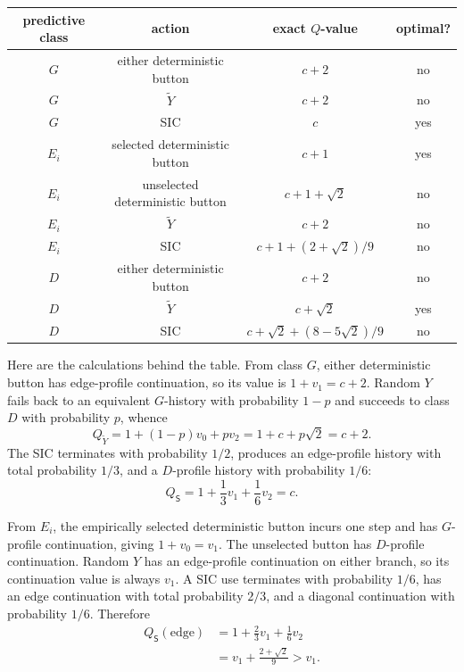 \documentclass[11pt]{article}
\theoremstyle{definition}
\theoremstyle{remark}
\begin{document}
\begin{center}
\small
\begin{tabular}{c c c c}
\toprule
predictive class & action & exact \(Q\)-value & optimal?\\
\midrule
\(G\) & either deterministic button & \(c+2\) & no\\
\(G\) & \(\widetilde Y\) & \(c+2\) & no\\
\(G\) & SIC & \(c\) & yes\\
\midrule
\(E_i\) & selected deterministic button & \(c+1\) & yes\\
\(E_i\) & unselected deterministic button & \(c+1+\sqrt2\) & no\\
\(E_i\) & \(\widetilde Y\) & \(c+2\) & no\\
\(E_i\) & SIC & \(c+1+(2+\sqrt2)/9\) & no\\
\midrule
\(D\) & either deterministic button & \(c+2\) & no\\
\(D\) & \(\widetilde Y\) & \(c+\sqrt2\) & yes\\
\(D\) & SIC & \(c+\sqrt2+(8-5\sqrt2)/9\) & no\\
\bottomrule
\end{tabular}
\end{center}

Here are the calculations behind the table. From class \(G\), either
deterministic button has edge-profile continuation, so its value is
\(1+v_1=c+2\). Random \(Y\) fails back to an equivalent \(G\)-history with
probability \(1-p\) and succeeds to class \(D\) with probability
\(p\), whence
\[
 Q_{\widetilde Y}=1+(1-p)v_0+pv_2
 =1+c+p\sqrt2=c+2.
\]
The SIC terminates with probability \(1/2\), produces an edge-profile history
with total probability \(1/3\), and a \(D\)-profile history with probability
\(1/6\):
\[
 Q_{\mathsf S}=1+\frac13v_1+\frac16v_2=c.
\]

From \(E_i\), the empirically selected deterministic button incurs one step
and has \(G\)-profile continuation, giving \(1+v_0=v_1\). The unselected
button has \(D\)-profile continuation. Random \(Y\) has an edge-profile
continuation on either branch, so its continuation value is always \(v_1\).
A SIC use terminates with probability \(1/6\), has
an edge continuation with total probability \(2/3\), and a diagonal
continuation with probability \(1/6\). Therefore
\begin{align*}
 Q_{\mathsf S}(\text{edge})
 &=1+\frac23v_1+\frac16v_2\\
 &=v_1+\frac{2+\sqrt2}{9}>v_1.
\end{align*}
\end{document}
